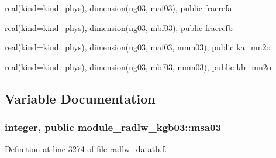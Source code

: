 \begin{DoxyCompactItemize}
\item 
real(kind=kind\+\_\+phys), dimension(ng03, \hyperlink{group__module__radlw__main_ga90d1081db011f0682cb4a83c40c5bb23}{maf03}), public \hyperlink{group__module__radlw__main_ga26e901a002e789933c5c9b622f3a0932}{fracrefa}
\item 
real(kind=kind\+\_\+phys), dimension(ng03, \hyperlink{group__module__radlw__main_ga655fff8711d78d62ae9d4fa27d02621a}{mbf03}), public \hyperlink{group__module__radlw__main_gaf1d33a7362e73bf40ef592bc9863b612}{fracrefb}
\item 
real(kind=kind\+\_\+phys), dimension(ng03, \hyperlink{group__module__radlw__main_ga90d1081db011f0682cb4a83c40c5bb23}{maf03}, \hyperlink{group__module__radlw__main_gab4e84b10460930267256c0e5a1fe7a55}{mmn03}), public \hyperlink{group__module__radlw__main_gaeeba4e0a8fc97c557e1127b4d5d1bd94}{ka\+\_\+mn2o}
\item 
real(kind=kind\+\_\+phys), dimension(ng03, \hyperlink{group__module__radlw__main_ga655fff8711d78d62ae9d4fa27d02621a}{mbf03}, \hyperlink{group__module__radlw__main_gab4e84b10460930267256c0e5a1fe7a55}{mmn03}), public \hyperlink{group__module__radlw__main_gaa2442e663e83b222648a86a34cd6631c}{kb\+\_\+mn2o}
\end{DoxyCompactItemize}


\subsection{Variable Documentation}
\subsubsection[{\texorpdfstring{msa03}{msa03}}]{\setlength{\rightskip}{0pt plus 5cm}integer, public module\+\_\+radlw\+\_\+kgb03\+::msa03}\hypertarget{namespacemodule__radlw__kgb03_a78658032153f7a4cbeaa198cbe661244}{}\label{namespacemodule__radlw__kgb03_a78658032153f7a4cbeaa198cbe661244}


Definition at line 3274 of file radlw\+\_\+datatb.\+f.

